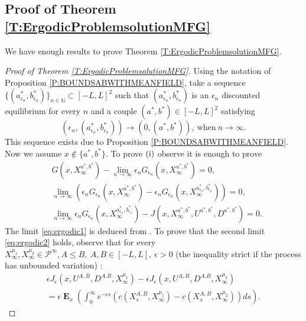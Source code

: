 \documentclass{article}
\newcommand\E{\operatorname{\mathbf{E}}}
\begin{document}
\subsection{Proof of Theorem \ref{T:ErgodicProblemsolutionMFG}}
We have enough results to prove Theorem \ref{T:ErgodicProblemsolutionMFG}.
\begin{proof}[Proof of Theorem \ref{T:ErgodicProblemsolutionMFG}] Using the notation of Proposition \ref{P:BOUNDSABWITHMEANFIELD},
take a sequence \newline $\lbrace (a^{\ast}_{ \epsilon_n},b^{\ast}_{\epsilon_n})\rbrace_{n \in \mathbb{N}} \subset [-L,L]^2 $ such that  $(a^{\ast}_{\epsilon_n},b^{\ast}_{\epsilon_n})$ is an $\epsilon_n$ discounted equilibrium for every $n$ and a couple $(a^{\ast},b^{\ast}) \in [-L,L]^2$ satisfying 
$$ (\epsilon_n, (a^{\ast}_{ \epsilon_n},b^{\ast}_{\epsilon_n})) \to (0,(a^{\ast},b^{\ast})), \ \text{when} \ n \to \infty.$$ This sequence exists due to Proposition \ref{P:BOUNDSABWITHMEANFIELD}. Now we assume $x \notin \lbrace a^{\ast},b^{\ast}\rbrace$. To prove $\rm{(i)}$ observe it is enough to prove
\begin{align}
\label{eq:ergodic1}&G(x,X_{\infty}^{a^{\ast},b^{\ast}})-\lim_{n \to \infty}  \epsilon_n G_{\epsilon_n}(x,X_{\infty}^{a^{\ast},b^{\ast}})=0, \\
\label{eq:ergodic2}&\lim_{n \to \infty}\left( \epsilon_n G_{\epsilon_n}(x,X_{\infty}^{a^{\ast},b^{\ast}}) - \epsilon_n G_{\epsilon_n}(x,X_{\infty}^{a^{\ast}_{\epsilon_n},b^{\ast}_{\epsilon_n}}) \right) =0,\\
\label{eq:ergodic3}&\lim_{n \to \infty} \epsilon_n G_{\epsilon_n}(x,X_{\infty}^{a^{\ast}_{\epsilon_n},b^{\ast}_{\epsilon_n}})- J(x,X_{\infty}^{a^{\ast},b^{\ast}},U^{a^{\ast},b^{\ast}},D^{a^{\ast},b^{\ast}})=0.
\end{align}
The limit \eqref{eq:ergodic1} is deduced from \cite[Theorem 2]{MO}.  To prove that the second limit \eqref{eq:ergodic2} holds, observe that for every $ X_{\infty}^{\mu_1} , X_{\infty}^{\mu_2} \in \mathcal{P}^{\infty},A\leq B  , \ A,B \in [-L,L], \ \epsilon>0 $ (the inequality strict if the process has unbounded variation) :
\begin{multline*}
\epsilon J_{\epsilon}(x,U^{A,B},D^{A.B},X_{\infty}^{\mu_1} )-\epsilon J_{\epsilon}(x,U^{A,B},D^{A.B},X_{\infty}^{\mu_2} ) \\ =\epsilon \E_x \left(\int_0^{\infty} e^{-\epsilon s}\left( c(X_s^{A,B},X_{\infty}^{\mu_1} )-c(X_s^{A,B},X_{\infty}^{\mu_2} ) \right)ds  \right) .
\end{multline*} 

\end{proof}
\end{document}
